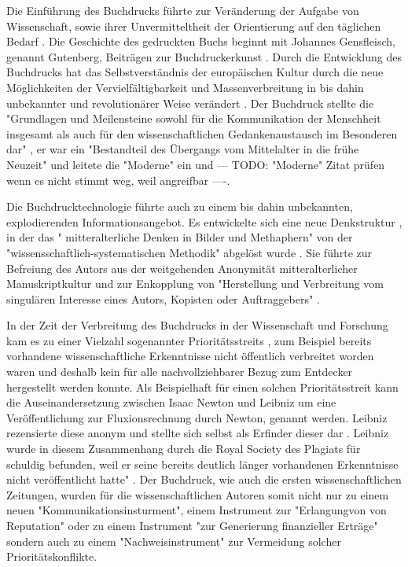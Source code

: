 Die Einführung des Buchdrucks führte zur Veränderung der Aufgabe von Wissenschaft, sowie ihrer Unvermitteltheit der Orientierung auf den täglichen Bedarf \cite{Luhmann1998}. Die Geschichte des gedruckten Buchs beginnt mit Johannes Gensfleisch, genannt Gutenberg, Beiträgen zur Buchdruckerkunst \cite{wittmann_1999_geschichte}. Durch die Entwicklung des Buchdrucks hat das Selbstverständnis der europäischen Kultur durch die neue Möglichkeiten der Vervielfältigbarkeit und Massenverbreitung in bis dahin unbekannter \cite{giesecke_1991_buchdruck} und revolutionärer Weise verändert \cite{wunderlich_2008_buchdruck}. Der Buchdruck stellte die "Grundlagen und Meilensteine sowohl für die Kommunikation der Menschheit insgesamt als auch für den wissenschaftlichen Gedankenaustausch im Besonderen dar" \cite{schirmbacher_2009_wisspub}, er war ein "Bestandteil des Übergangs vom Mittelalter in die frühe Neuzeit" \cite{lange2008medienwettbewerb} und leitete die "Moderne" ein \cite{luhmann_1997_gesellschaft} und  --- TODO: "Moderne" Zitat prüfen wenn es nicht stimmt weg, weil angreifbar ----. 

Die Buchdrucktechnologie führte auch zu einem bis dahin unbekannten, explodierenden Informationsangebot. Es entwickelte sich eine neue Denkstruktur \cite{eisenstein_1997_druckerpresse}, in der das " mitteralterliche Denken in Bilder und Methaphern" von der "wissensschaftlich-systematischen Methodik" abgelöst wurde \cite{wunderlich_2008_buchdruck}. Sie führte zur Befreiung des Autors aus der weitgehenden Anonymität mitteralterlicher Manuskriptkultur und zur Enkopplung von "Herstellung und Verbreitung vom singulären Interesse eines Autors, Kopisten oder Auftraggebers"\cite{wunderlich_2008_buchdruck} \cite{schirmbacher_2009_wisspub}. 

In der Zeit der Verbreitung des Buchdrucks in der Wissenschaft und Forschung kam es zu einer Vielzahl sogenannter Prioritätsstreits \cite{schirmbacher_2009_wisspub}, zum Beispiel bereits vorhandene wissenschaftliche Erkenntnisse nicht öffentlich verbreitet worden waren und deshalb kein für alle nachvollziehbarer Bezug zum Entdecker hergestellt werden konnte. Als Beispielhaft für einen solchen Prioritätsstreit kann die Auseinandersetzung zwischen Isaac Newton und Leibniz um eine Veröffentlichung zur Fluxionsrechnung durch Newton, genannt werden. Leibniz rezensierte diese anonym und stellte sich selbst als Erfinder dieser dar \cite{2013_leibniz}. Leibniz wurde in diesem Zusammenhang durch die Royal Society des Plagiats für schuldig befunden, weil er seine bereits deutlich länger vorhandenen Erkenntnisse nicht veröffentlicht hatte" \cite{schirmbacher_2009_wisspub}. Der Buchdruck, wie auch die ersten wissenschaftlichen Zeitungen, wurden für die wissenschaftlichen Autoren somit nicht nur zu einem neuen "Kommunikationsinsturment", einem Instrument zur "Erlangungvon von Reputation" oder zu einem Instrument "zur Generierung finanzieller Erträge" sondern auch zu einem "Nachweisinstrument" \cite{wunderlich_2008_buchdruck} \cite{schirmbacher_2009_wisspub} zur Vermeidung solcher Prioritätskonflikte. 

